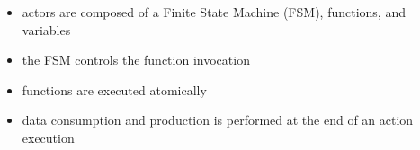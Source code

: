 \begin{frame}
\begin{figure}
\centering
\resizebox{0.7\columnwidth}{!}{}
\end{figure}
\begin{itemize}
\item actors are composed of a Finite State Machine (FSM), functions, and variables
\item the FSM controls the function invocation
\item functions are executed atomically
\item data consumption and production is performed at the end of an action execution
\end{itemize}
\end{frame}

